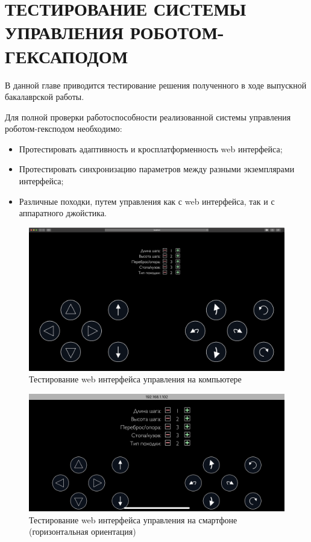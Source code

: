 \chapter{ТЕСТИРОВАНИЕ СИСТЕМЫ УПРАВЛЕНИЯ РОБОТОМ-ГЕКСАПОДОМ}

В данной главе приводится тестирование решения полученного в ходе выпускной бакалаврской работы.

Для полной проверки работоспособности реализованной системы управления роботом-гексподом необходимо:

\begin{itemize}
	\item Протестировать адаптивность и кросплатформенность web интерфейса;
	\item Протестировать синхронизацию параметров между разными экземплярами интерфейса;
	\item Различные походки, путем управления как с web интерфейса, так и с аппаратного джойстика.
\end{itemize}

\begin{figure}[h!]
	\centering
	\includegraphics[width = \linewidth]{img/test1}
	\caption{Тестирование web интерфейса управления на компьютере}
	\label{img:test1}
\end{figure}

\begin{figure}[h!]
	\centering
	\includegraphics[width = \linewidth]{img/test2}
	\caption{Тестирование web интерфейса управления на смартфоне (горизонтальная ориентация)}
	\label{img:test2}
\end{figure}

